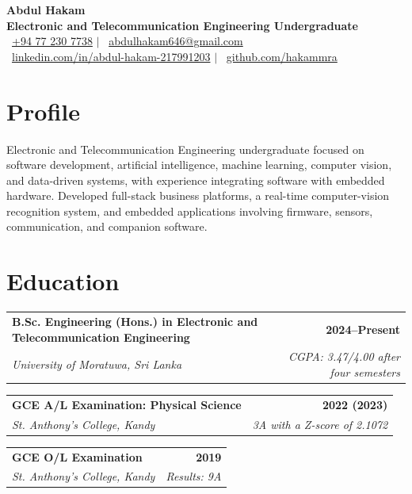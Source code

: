 \documentclass[a4paper,10pt]{article}
\makeatletter
\newcommand{\educationEntry}[4]{%
  \begin{tabularx}{\textwidth}{@{}Xr@{}}
    \textbf{#1} & \textbf{\small #2} \\
    \textit{#3} & \textit{\small #4}
  \end{tabularx}
}
\makeatother
\begin{document}
\fontsize{9.5}{11.25}\selectfont

\begin{center}
  {\LARGE\bfseries Abdul Hakam}\\[0.75mm]
  {\large\bfseries Electronic and Telecommunication Engineering Undergraduate}\\[1.5mm]

  \small
  \faPhone\ \href{tel:+94772307738}{+94 77 230 7738}
  \quad $\vert$ \quad
  \faEnvelope\ \href{mailto:abdulhakam646@gmail.com}{abdulhakam646@gmail.com}\\[0.8mm]

  \faLinkedin\ 
  \href{https://www.linkedin.com/in/abdul-hakam-217991203}
  {linkedin.com/in/abdul-hakam-217991203}
  \quad $\vert$ \quad
  \faGithub\ 
  \href{https://github.com/hakammra}
  {github.com/hakammra}
\end{center}

\vspace{-1.2mm}

\section{Profile}
Electronic and Telecommunication Engineering undergraduate focused on software development, artificial intelligence, machine learning, computer vision, and data-driven systems, with experience integrating software with embedded hardware. Developed full-stack business platforms, a real-time computer-vision recognition system, and embedded applications involving firmware, sensors, communication, and companion software.
\section{Education}
\educationEntry
  {B.Sc. Engineering (Hons.) in Electronic and Telecommunication Engineering}
  {2024--Present}
  {University of Moratuwa, Sri Lanka}
  {CGPA: 3.47/4.00 after four semesters}

\vspace{1.35mm}
\educationEntry
  {GCE A/L Examination: Physical Science}
  {2022 (2023)}
  {St. Anthony's College, Kandy}
  {3A with a Z-score of 2.1072}

\vspace{1.35mm}
\educationEntry
  {GCE O/L Examination}
  {2019}
  {St. Anthony's College, Kandy}
  {Results: 9A}
\end{document}
